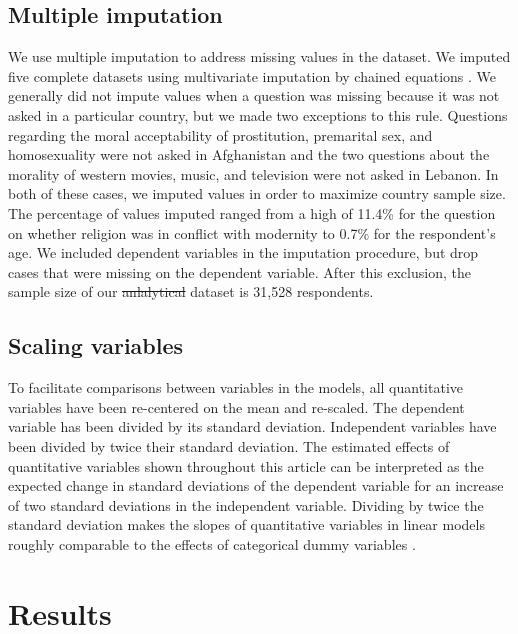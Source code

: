 \documentclass[10pt,letterpaper]{article}
\providecommand{\DIFaddtex}[1]{{\protect\color{blue}\uwave{#1}}} %
\providecommand{\DIFdeltex}[1]{{\protect\color{red}\sout{#1}}}                      %
\providecommand{\DIFaddbegin}{} %
\providecommand{\DIFaddend}{} %
\providecommand{\DIFdelbegin}{} %
\providecommand{\DIFdelend}{} %
\providecommand{\DIFadd}[1]{\texorpdfstring{\DIFaddtex{#1}}{#1}} %
\providecommand{\DIFdel}[1]{\texorpdfstring{\DIFdeltex{#1}}{}} %
\newcommand{\DIFscaledelfig}{0.5}
\newlength{\DIFdelgraphicswidth} %
\newlength{\DIFdelgraphicsheight} %
\newcommand{\DIFaddincludegraphics}[2][]{{\color{blue}\fbox{\DIFOincludegraphics[#1]{#2}}}} %
\newcommand{\DIFdelincludegraphics}[2][]{%
\sbox{\DIFdelgraphicsbox}{\DIFOincludegraphics[#1]{#2}}%
\settoboxwidth{\DIFdelgraphicswidth}{\DIFdelgraphicsbox} %
\settoboxtotalheight{\DIFdelgraphicsheight}{\DIFdelgraphicsbox} %
\scalebox{\DIFscaledelfig}{%
\parbox[b]{\DIFdelgraphicswidth}{\usebox{\DIFdelgraphicsbox}\\[-\baselineskip] \rule{\DIFdelgraphicswidth}{0em}}\llap{\resizebox{\DIFdelgraphicswidth}{\DIFdelgraphicsheight}{%
\setlength{\unitlength}{\DIFdelgraphicswidth}%
\begin{picture}(1,1)%
\thicklines\linethickness{2pt} %
{\color[rgb]{1,0,0}\put(0,0){\framebox(1,1){}}}%
{\color[rgb]{1,0,0}\put(0,0){\line( 1,1){1}}}%
{\color[rgb]{1,0,0}\put(0,1){\line(1,-1){1}}}%
\end{picture}%
}\hspace*{3pt}}} %
} %
\DeclareRobustCommand{\DIFaddbegin}{\DIFOaddbegin \let\includegraphics\DIFaddincludegraphics} %
\DeclareRobustCommand{\DIFaddend}{\DIFOaddend \let\includegraphics\DIFOincludegraphics} %
\DeclareRobustCommand{\DIFdelbegin}{\DIFOdelbegin \let\includegraphics\DIFdelincludegraphics} %
\DeclareRobustCommand{\DIFdelend}{\DIFOaddend \let\includegraphics\DIFOincludegraphics} %
\begin{document}
\subsection*{Multiple imputation}

We use multiple imputation to address missing values in the dataset. We imputed five complete datasets using multivariate imputation by chained equations \cite{buuren_mice_2011}. We generally did not impute values when a question was missing because it was not asked in a particular country, but we made two exceptions to this rule. Questions regarding the moral acceptability of prostitution, premarital sex, and homosexuality were not asked in Afghanistan and the two questions about the morality of western movies, music, and television were not asked in Lebanon. In both of these cases, we imputed values in order to maximize country sample size. The percentage of values imputed ranged from a high of 11.4\% for the question on whether religion was in conflict with modernity to 0.7\% for the respondent's age. We included dependent variables in the imputation procedure, but drop cases that were missing on the dependent variable. After this exclusion, the sample size of our \DIFdelbegin \DIFdel{anlalytical }\DIFdelend \DIFaddbegin \DIFadd{analytical }\DIFaddend dataset is 31,528 respondents.

\subsection*{Scaling variables}

To facilitate comparisons between variables in the models, all quantitative variables have been re-centered on the mean and re-scaled. The dependent variable has been divided by its standard deviation. Independent variables have been divided by twice their standard deviation. The estimated effects of quantitative variables shown throughout this article can be interpreted as the expected change in standard deviations of the dependent variable for an increase of two standard deviations in the independent variable. Dividing by twice the standard deviation makes the slopes of quantitative variables in linear models roughly comparable to the effects of categorical dummy variables \cite{gelman_scaling_2008}.

\section*{Results}
\end{document}
